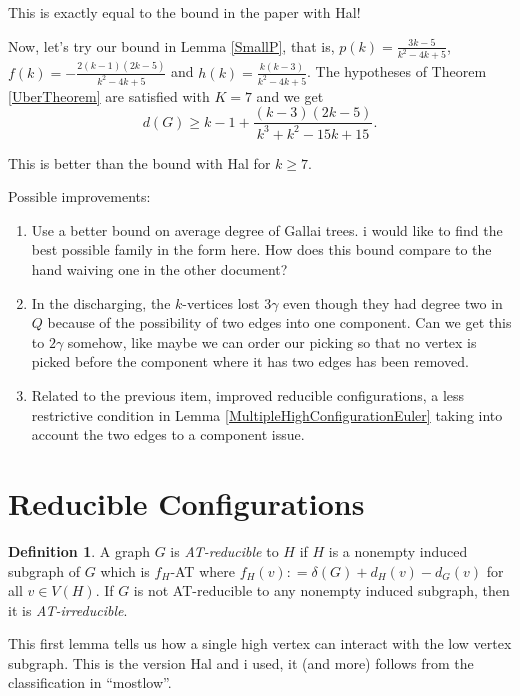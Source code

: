\documentclass[12pt]{article}
\theoremstyle{plain}
\theoremstyle{definition}
\newtheorem{defn}{Definition}
\theoremstyle{remark}
\newcommand{\DefinedAs}{\mathrel{\mathop:}=}
\begin{document}
This is exactly equal to the bound in the paper with Hal!  

Now, let's try our bound in
Lemma \ref{SmallP}, that is, $p(k) = \frac{3k-5}{k^2 - 4k + 5}$, $f(k) = -\frac{2(k-1)(2k-5)}{k^2 - 4k + 5}$ and $h(k) = \frac{k(k-3)}{k^2 - 4k + 5}$.  The hypotheses of Theorem \ref{UberTheorem} are satisfied with $K=7$ and we get
 \[d(G) \ge k-1 + \frac{(k-3)(2k-5)}{k^3 + k^2 - 15k + 15}.\]
 
This is better than the bound with Hal for $k \ge 7$.  



Possible improvements:

\begin{enumerate}
	\item Use a better bound on average degree of Gallai trees.  i would like to find the best possible family in the form here.  How does this bound compare to the hand waiving one in the other document?
	\item In the discharging, the $k$-vertices lost $3\gamma$ even though they had degree two in $Q$ because of the possibility of two edges into one component.  Can we get this to $2\gamma$ somehow, like maybe we can order our picking so that no vertex is picked before the component where it has two edges has been removed.   
	\item Related to the previous item, improved reducible configurations, a less restrictive condition in Lemma \ref{MultipleHighConfigurationEuler} taking into account the two edges to a component issue.
\end{enumerate}

\section{Reducible Configurations}
\begin{defn}
	A graph $G$ is \emph{AT-reducible} to $H$ if $H$ is a nonempty induced subgraph of $G$ which is $f_H$-AT where $f_H(v) \DefinedAs \delta(G) + d_H(v) - d_G(v)$ for all $v \in V(H)$.  
	If $G$ is not AT-reducible to any nonempty induced subgraph, then it is \emph{AT-irreducible}.
\end{defn}

This first lemma tells us how a single high vertex can interact with the low vertex subgraph.  This is the version Hal and i used, it (and more) follows from the classification in ``mostlow''.
\end{document}

